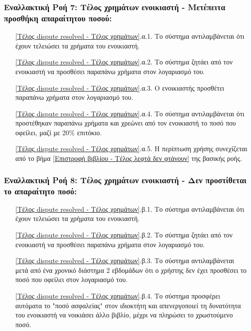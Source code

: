 \documentclass[12pt,a4paper]{article}
\begin{document}
\subsubsection*{Εναλλακτική Ροή 7: Τέλος χρημάτων ενοικιαστή - Μετέπειτα προσθήκη απαραίτητου ποσού:}
\begin{enumerate}
    \item[\ref{Τέλος dispute resolved - Τέλος χρημάτων}.α.1.] Το σύστημα αντιλαμβάνεται ότι έχουν τελειώσει τα χρήματα του ενοικιαστή.
    \item[\ref{Τέλος dispute resolved - Τέλος χρημάτων}.α.2.] Το σύστημα ζητάει από τον ενοικιαστή να προσθέσει παραπάνω χρήματα στον λογαριασμό του.
    \item[\ref{Τέλος dispute resolved - Τέλος χρημάτων}.α.3.] Ο ενοικιαστής προσθέτει παραπάνω χρήματα στον λογαριασμό του.
    \item[\ref{Τέλος dispute resolved - Τέλος χρημάτων}.α.4.] Το σύστημα αντιλαμβάνεται ότι προστέθηκαν παραπάνω χρήματα και χρεώνει από τον ενοικιαστή το ποσό που οφείλει, μαζί με 20\% επιτόκιο.
    \item[\ref{Τέλος dispute resolved - Τέλος χρημάτων}.α.5.] Η περίπτωση χρήσης συνεχίζεται από το βήμα \ref{Επιστροφή βιβλίου - Τέλος λεφτά δεν φτάνουν} της βασικής ροής.
\end{enumerate}

\subsubsection*{Εναλλακτική Ροή 8: Τέλος χρημάτων ενοικιαστή - Δεν προστίθεται το απαραίτητο ποσό:}
\begin{enumerate}
    \item[\ref{Τέλος dispute resolved - Τέλος χρημάτων}.β.1.] Το σύστημα αντιλαμβάνεται ότι έχουν τελειώσει τα χρήματα του ενοικιαστή.
    \item[\ref{Τέλος dispute resolved - Τέλος χρημάτων}.β.2.] Το σύστημα ζητάει από τον ενοικιαστή να προσθέσει παραπάνω χρήματα στον λογαριασμό του.
    \item[\ref{Τέλος dispute resolved - Τέλος χρημάτων}.β.3.] Το σύστημα αντιλαμβάνεται μετά από ένα χρονικό διάστημα 2 εβδομάδων ότι ο χρήστης δεν έχει προσθέσει το ποσό που οφείλει στον λογαριασμό του.
    \item[\ref{Τέλος dispute resolved - Τέλος χρημάτων}.β.4.] Το σύστημα προσφέρει αυτόματα το "ποσό ασφαλείας" στον ιδιοκτήτη και απενεργοποιεί τη δυνατότητα του ενοικιαστή να νοικιάσει άλλο βιβλίο, μέχρι να πληρώσει το χρωστούμενο ποσό.
\end{enumerate}
\end{document}
